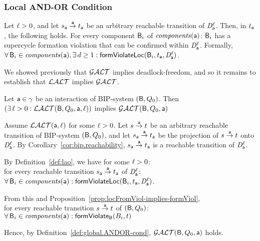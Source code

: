 \subsubsection{Local AND-OR Condition}

 \label{def:lao}
Let $\l > 0$, and let $s_\act \goesto[\act] t_\act$ be an arbitrary reachable transition of $\dsk{\act}{\l}$.
Then, in $t_\act$, the following holds. 
For every component $\B_i$ of $\cmps{\act}$:  
$\B_i$ has a supercycle formation violation that can be confirmed within $\dsk{\act}{\l}$.
Formally,\\
\ind  $\fa \B_i \in \cmps{\act}, \ex d \ge 1: \locFormViol{\B_i}{t_\act}{\act}{\l}$.
\ed

We showed previously that $\GAO$ implies deadlock-freedom, and so it remains to establish that $\LAO$ implies $\GAO$. 




\bl \label{lemma:loc.ANDOR.implies.glob.AND-OR}
Let $\act \in \gamma$ be an interaction of BIP-system $(\B, Q_0)$. Then\\
\ind $(\ex \l > 0: \LAO(\B, Q_0, \act, \l))$ implies $\GAO(\B, Q_0, \act)$
\el
%

\bpr
Assume $\LAO(\act, \l)$ for some $\l > 0$. 
%
Let $s \goesto[\act] t$ be an arbitrary reachable transition of BIP-system $(\B, Q_0)$, and let 
$s_\act \goesto[\act] t_\act$ be the projection of $s \goesto[\act] t$ onto $\dsk{\act}{\l}$.
By Corollary~\ref{cor:bip.reachability}, $s_\act \goesto[\act] t_\act$ is a reachable transition of $\dsk{\act}{\l}$.

\noindent
By Definition~\ref{def:lao}, we have for some $\l > 0$:\\
\ind for every reachable transition $s_\act \goesto[\act] t_\act$ of $\dsk{\act}{\l}$:\\
\ind \ind $\fa \B_i \in \cmps{\act} : \locFormViol{\B_i}{t_\act}{\act}{\l}$.

\noindent
From this and Proposition~\ref{prop:locFromViol-implies-formViol},\\
\ind for every reachable transition $s \goesto[\act] t$ of  $(\B, Q_0)$:\\ 
\ind \ind $\fa \B_i \in \cmps{\act} : \formViol{B_i}{t}$

\noindent
Hence, by Definition~\ref{def:global.ANDOR-cond}, $\GAO(\B, Q_0, \act)$ holds.
\epr



